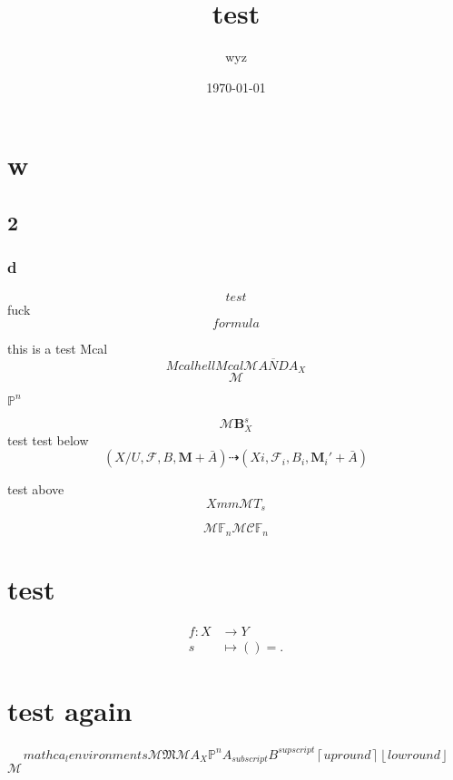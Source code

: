 \documentclass{article}
\title{test}
\author{wyz}
\date{\today}
\begin{document}
\maketitle
\section{w}
\subsection{2}

\subsubsection{d}
\begin{equation}
  test
\end{equation}
fuck
\[
  formula
\]

\newpage

this is a test
Mcal
\begin{equation}
  Mcal hell Mcal
  \mathcal{M}  \overline{AND} A_{X}
\end{equation}
\[
  \mathcal{M}
\]

$\mathbb{P}^{n}$

\[
  \mathcal{M} \mathbf{B}_{X}^{s}
\]
test
test below
\[
  (X/U,\mathcal{F},B,\mathbf{M}+ \bar{A})  \dashrightarrow (Xi,\mathcal{F}_{i},B_{i},\mathbf{M}_{i}'+\bar{A})
\]

test above
\[
  Xmm  \mathcal{M} T_{s}
\]

\[
  \mathcal{M} \mathbb{F}_{n}
  \mathcal{M} \mathcal{C} \mathbb{F}_{n}
\]

\section{test}
\begin{center}
  \begin{align*}
    f : X & \longrightarrow Y \\
    s     & \longmapsto () =
    .
  \end{align*}
\end{center}

\section{test again}
\[
  mathca_{l} environments  \mathcal{M} \mathfrak{M} \mathscr{M} A_{X} \mathbb{P}^{n} A_{subscript} B^{supscript} \left\lceil up round \right\rceil \left\lfloor low round \right\rfloor
\] $\mathcal{M}$
\end{document}
